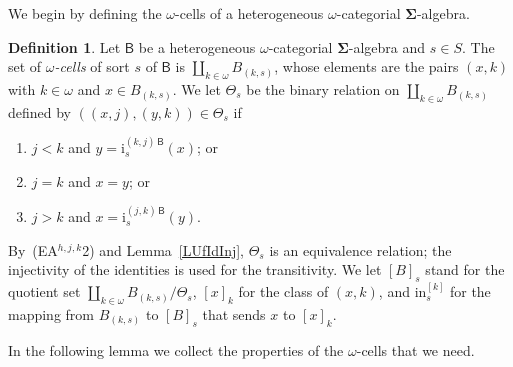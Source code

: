 \documentclass[a4paper, reqno]{amsbook}
\newcommand{\sig}[1]{\mathbf{#1}}             %
\newcommand{\calg}[1]{\boldsymbol{\mathsf{#1}}} %
\theoremstyle{plain}
\theoremstyle{definition}
\newtheorem{definition}[theorem]{Definition}
\begin{document}
We begin by defining the $\omega$-cells of a heterogeneous $\omega$-categorial $\sig{\Sigma}$-algebra.

\begin{definition}\label{DUfCellsOmega}
Let $\calg{B}$ be a heterogeneous $\omega$-categorial $\sig{\Sigma}$-algebra and $s\in S$.
The set of \emph{$\omega$-cells} of sort $s$ of $\calg{B}$ is $\coprod_{k\in\omega}B_{(k,s)}$, whose elements are the pairs $(x,k)$ with $k\in\omega$ and $x\in B_{(k,s)}$.
We let $\Theta_{s}$ be the binary relation on $\coprod_{k\in\omega}B_{(k,s)}$ defined by $((x,j),(y,k))\in\Theta_{s}$ if
\begin{enumerate}
\item $j<k$ and $y=\mathrm{i}^{(k,j)\,\calg{B}}_{s}(x)$; or
\item $j=k$ and $x=y$; or
\item $j>k$ and $x=\mathrm{i}^{(j,k)\,\calg{B}}_{s}(y)$.
\end{enumerate}
By~(EA$^{h,j,k}$2) and Lemma~\ref{LUfIdInj}, $\Theta_{s}$ is an equivalence relation; the injectivity of the identities is used for the transitivity.
We let $[B]_{s}$ stand for the quotient set $\coprod_{k\in\omega}B_{(k,s)}/\Theta_{s}$, $[x]_{k}$ for the class of $(x,k)$, and $\mathrm{in}^{[k]}_{s}$ for the mapping from $B_{(k,s)}$ to $[B]_{s}$ that sends $x$ to $[x]_{k}$.
\end{definition}

In the following lemma we collect the properties of the $\omega$-cells that we need.
\end{document}
